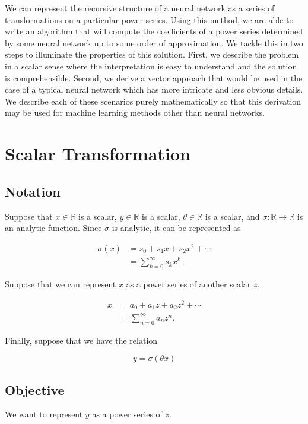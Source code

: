We can represent the recursive structure of a neural network as a series of transformations on a particular power series. Using this method, we are able to write an algorithm that will compute the coefficients of a power series determined by some neural network up to some order of approximation. We tackle this in two steps to illuminate the properties of this solution. First, we describe the problem in a scalar sense where the interpretation is easy to understand and the solution is comprehensible. Second, we derive a vector approach that would be used in the case of a typical neural network which has more intricate and less obvious details. We describe each of these scenarios purely mathematically so that this derivation may be used for machine learning methods other than neural networks.

\section{Scalar Transformation}

\subsection{Notation}
Suppose that $x \in \mathbb{R}$ is a scalar, $y \in \mathbb{R}$ is a scalar, $\theta \in \mathbb{R}$ is a scalar, and $\sigma: \mathbb{R} \to \mathbb{R}$ is an analytic function. Since $\sigma$ is analytic, it can be represented as

\begin{align*}
    \sigma(x)
    &= s_0 + s_1 x + s_2 x^2 + \cdots \\
    &= \sum_{k=0}^{\infty} s_{k} x^{k}.
\end{align*}

Suppose that we can represent $x$ as a power series of another scalar $z$.

\begin{align*}
    x
    &= a_0 + a_1 z + a_2 z^2 + \cdots \\
    &= \sum_{n=0}^{\infty} a_{n} z^{n}.
\end{align*}

Finally, suppose that we have the relation

\begin{equation*}
    y = \sigma(\theta x)
\end{equation*}

\subsection{Objective}
We want to represent $y$ as a power series of $z$.

